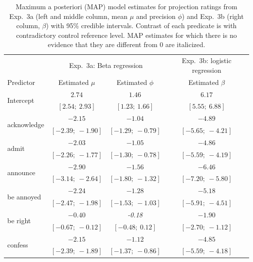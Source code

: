 \documentclass[11pt,fleqn]{article}
\newcommand{\6}{\mbox{$[\hspace*{-.6mm}[$}}
\newcommand{\9}{\mbox{$]\hspace*{-.6mm}]$}}
\begin{document}
\begin{table}
\caption{Maximum a posteriori (MAP) model estimates for projection ratings from Exp.~3a (left and middle column, mean $\mu$ and precision $\phi$) and Exp.~3b (right column, $\beta$)  with 95\% credible intervals. Contrast of each predicate is with contradictory control reference level. MAP estimates for which there is no evidence that they are different from 0 are italicized.}
\small
\begin{center}
\begin{tabular}{l c c c}
\toprule
& \multicolumn{2}{c}{Exp.~3a: Beta regression} & Exp.~3b: logistic regression \\
Predictor & Estimated $\mu$ & Estimated $\phi$ & Estimated $\beta$\\
\midrule
\multirow{2}{*}{Intercept}             & $2.74$        & $1.46$        & $6.17$          \\
                         & $[2.54;\ 2.93]$   & $[1.23;\ 1.66]$   & $[5.55;\ 6.88]$     \\
\multirow{2}{*}{acknowledge}       & $-2.15$       & $-1.04$       & $-4.89$         \\
                         & $[-2.39;\ -1.90]$ & $[-1.29;\ -0.79]$ & $[-5.65;\ -4.21]$   \\
\multirow{2}{*}{admit}             & $-2.03$       & $-1.05$       & $-4.86$         \\
                         & $[-2.26;\ -1.77]$ & $[-1.30;\ -0.78]$ & $[-5.59;\ -4.19]$   \\
\multirow{2}{*}{announce}          & $-2.90$       & $-1.56$       & $-6.46$         \\
                         & $[-3.14;\ -2.64]$ & $[-1.80;\ -1.32]$ & $[-7.20;\ -5.80]$   \\
\multirow{2}{*}{be annoyed}       & $-2.24$       & $-1.28$       & $-5.18$         \\
                         & $[-2.47;\ -1.98]$ & $[-1.53;\ -1.03]$ & $[-5.91;\ -4.51]$   \\
\multirow{2}{*}{be right}         & $-0.40$       & \emph{-0.18}           & $-1.90$         \\
                         & $[-0.67;\ -0.12]$ & $[-0.48;\ 0.12]$  & $[-2.70;\ -1.12]$   \\
\multirow{2}{*}{confess}           & $-2.15$       & $-1.12$       & $-4.85$         \\
                         & $[-2.39;\ -1.89]$ & $[-1.37;\ -0.86]$ & $[-5.59;\ -4.18]$   \\

\end{tabular}
\end{center}
\end{table}
\end{document}

